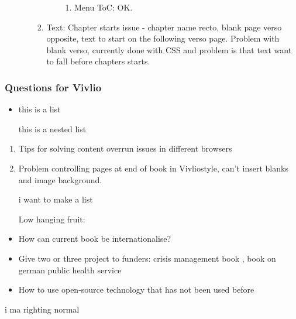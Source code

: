 \documentclass{article}
\begin{document}
\begin{enumerate}
\begin{enumerate}
\begin{enumerate}[start=3]
\begin{enumerate}
\begin{enumerate}
\item Menu ToC: OK.


\end{enumerate}

\end{enumerate}

\item Text: Chapter starts issue - chapter name recto, blank page verso opposite, text to start on the following verso page. Problem with blank verso, currently done with CSS and problem is that text want to fall before chapters starts.


\end{enumerate}

\end{enumerate}

\end{enumerate}

\subsubsection{\textbf{Questions for Vivlio}}\label{H1976743}


\begin{itemize}
\item this is a list 

this is a nested list


\end{itemize}
\begin{enumerate}
\item Tips for solving content overrun issues in different browsers


\item Problem controlling pages at end of book in Vivliostyle, can’t insert blanks and image background.



i want to make a list



Low hanging fruit:


\end{enumerate}






\begin{itemize}
\item How can current book be internationalise? 




\item Give two or three project to funders: crisis management book , book on german public health service


\item How to use open-source technology that has not been used before


\end{itemize}

i ma righting normal
\end{document}
